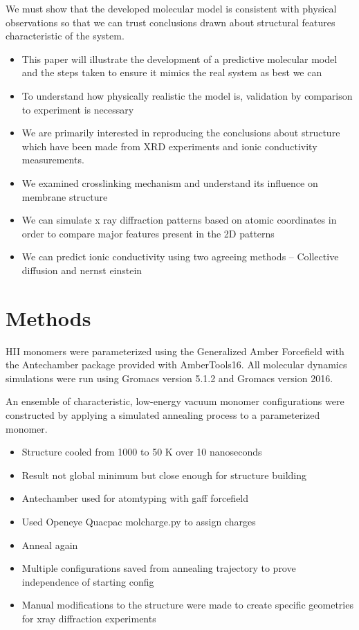\documentclass{article}
\begin{document}
	We must show that the developed molecular model is consistent with physical observations so that we can trust conclusions drawn about structural features characteristic of the system.
	\begin{itemize}
		\item This paper will illustrate the development of a predictive molecular model and the steps taken to ensure it mimics the real system as best we can 
		\item To understand how physically realistic the model is, validation by comparison to experiment is necessary
		\item We are primarily interested in reproducing the conclusions about structure which have been made from XRD experiments and ionic conductivity measurements.    
		\item We examined crosslinking mechanism and understand its influence on membrane structure
		\item We can simulate x ray diffraction patterns based on atomic coordinates in order to compare major features present in the 2D patterns
		\item We can predict ionic conductivity using two agreeing methods -- Collective diffusion and nernst einstein
	\end{itemize}
	
	\section{Methods}
	
	HII monomers were parameterized using the Generalized Amber Forcefield with the Antechamber package provided with AmberTools16. All molecular dynamics simulations were run using Gromacs version 5.1.2 and Gromacs version 2016.
	
	An ensemble of characteristic, low-energy vacuum monomer configurations were constructed by applying a simulated annealing process to a parameterized monomer.
	\begin{itemize}
		\item Structure cooled from 1000 to 50 K over 10 nanoseconds
		\item Result not global minimum but close enough for structure building
		\item Antechamber used for atomtyping with gaff forcefield
		\item Used Openeye Quacpac molcharge.py to assign charges %
		\item Anneal again 
		\item Multiple configurations saved from annealing trajectory to prove independence of starting config
		\item Manual modifications to the structure were made to create specific geometries for xray diffraction experiments
	\end{itemize}
	
\end{document}
